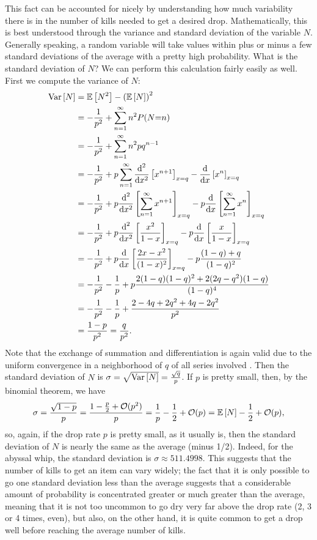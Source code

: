 \documentclass[letterpaper]{article}
\begin{document}
	This fact can be accounted for nicely by understanding how much variability there is in the number of kills needed to get a desired drop. Mathematically, this is best understood through the variance and standard deviation of the variable $N$. Generally speaking, a random variable will take values within plus or minus a few standard deviations of the average with a pretty high probability. What is the standard deviation of $N$? We can perform this calculation fairly easily as well. First we compute the variance of $N$:
	\begin{align}
		\notag
		\mathrm{Var}\left[N\right] &= \mathbb{E}\left[N^2\right] - \left(\mathbb{E}\left[N\right]\right)^2 \\\notag
		&=  - \frac{1}{p^2} + \sum_{n=1}^\infty n^2P(N{=}n) \\\notag
		&= -\frac{1}{p^2} + \sum_{n=1}^\infty n^2pq^{n-1} \\\notag
		&= -\frac{1}{p^2} + p\sum_{n=1}^\infty \frac{\text{d}^2}{\text{d}x^2}\left[x^{n+1}\right]_{x=q} - \frac{\text{d}}{\text{d}x}\left[x^n\right]_{x=q} \\\notag
		&= -\frac{1}{p^2} + p\frac{\text{d}^2}{\text{d}x^2}\left[\sum_{n=1}^\infty x^{n+1}\right]_{x=q} - p\frac{\text{d}}{\text{d}x}\left[\sum_{n=1}^\infty x^n\right]_{x=q} \\\notag
		&= -\frac{1}{p^2} + p\frac{\text{d}^2}{\text{d}x^2}\left[\frac{x^2}{1-x}\right]_{x=q} - p\frac{\text{d}}{\text{d}x}\left[\frac{x}{1-x}\right]_{x=q} \\\notag
		&= -\frac{1}{p^2} + p\frac{\text{d}}{\text{d}x}\left[\frac{2x - x^2}{(1-x)^2}\right]_{x=q} - p\frac{(1-q) + q}{(1-q)^2} \\\notag
		&= -\frac{1}{p^2} - \frac{1}{p} + p\frac{2(1-q)(1-q)^2 + 2(2q-q^2)(1-q)}{(1-q)^4} \\\notag
		&= -\frac{1}{p^2} - \frac{1}{p} + \frac{2-4q+2q^2 + 4q -2q^2}{p^2} \\
		&= \frac{1 - p}{p^2} = \frac{q}{p^2}.
	\end{align}
	Note that the exchange of summation and differentiation is again valid due to the uniform convergence in a neighborhood of $q$ of all series involved . Then the standard deviation of $N$ is $\sigma = \sqrt{\mathrm{Var}\left[N\right]} = \frac{\sqrt{q}}{p}$. If $p$ is pretty small, then, by the binomial theorem, we have
	\begin{equation}
		\sigma = \frac{\sqrt{1-p}}{p} = \frac{1- \frac{p}{2} + \mathcal{O}(p^2)}{p} = \frac{1}{p} - \frac{1}{2} + \mathcal{O}(p) = \mathbb{E}\left[N\right] - \frac{1}{2} + \mathcal{O}(p),
	\end{equation}
	so, again, if the drop rate $p$ is pretty small, as it usually is, then the standard deviation of $N$ is nearly the same as the average (minus 1/2). Indeed, for the abyssal whip, the standard deviation is $\sigma \approx 511.4998$. This suggests that the number of kills to get an item can vary widely; the fact that it is only possible to go one standard deviation less than the average suggests that a considerable amount of probability is concentrated greater or much greater than the average, meaning that it is not too uncommon to go dry very far above the drop rate (2, 3 or 4 times, even), but also, on the other hand, it is quite common to get a drop well before reaching the average number of kills.
	
\end{document}
